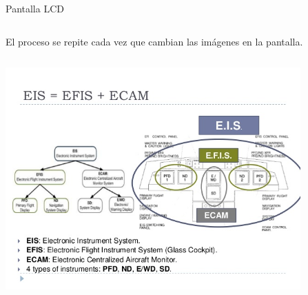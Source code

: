 \begin{frame}
\begin{block}{Pantalla \ac{LCD}}
\begin{columns}[T]
\begin{column}[T]{0.5\textwidth}
\begin{itemize}
{        \item El proceso se repite cada vez que cambian las im\'agenes en la pantalla.
	}
        \end{itemize}


      \end{column}
    \end{columns}

    \begin{itemize}
 {\footnotesize 
        \item           
	}
    \end{itemize}

  \end{block}
\end{frame}


\begin{frame}

\includegraphics[width=0.85\textwidth]{imagenes/1.4.pantalla.electronica/efis.jpg}

\end{frame}

  

    





